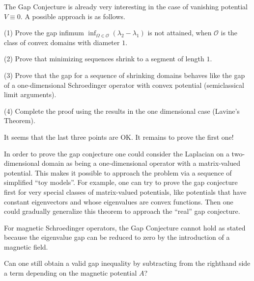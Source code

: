 \documentclass[12pt,letterpaper, reqno]{amsart}
\begin{document}
\begin{problemblock}
\begin{problem}[3.4]  
The Gap Conjecture is already
very interesting in the case of vanishing potential $V \equiv 0$. A
possible approach is as follows.

(1) Prove the gap infimum $\inf_{\Omega \in \mathcal{O}} (\lambda_2-\lambda_1)$
is not attained, when $\mathcal{O}$ is the class of convex domains
with diameter $1$.

(2) Prove that minimizing sequences shrink to a segment of
length $1$.

(3) Prove that the gap for a sequence of shrinking domains
behaves like the gap of a one-dimensional Schroedinger
operator with convex potential (semiclassical limit arguments).

(4) Complete the proof using the results in the one dimensional case (Lavine's Theorem).

\end{problem}
\begin{distinguishedremark}
It seems that the last three points are OK. It remains to prove the first one!
\end{distinguishedremark}
\end{problemblock}




\begin{problemblock} 
\begin{problem}[3.5]  
In order to prove the gap conjecture one could consider
the Laplacian on a two-dimensional domain as being a one-dimensional
operator with a matrix-valued potential. This makes it possible to
approach the problem via a sequence of simplified ``toy models''.
For example, one can try to prove the gap conjecture first for very
special classes of matrix-valued potentials, like potentials that
have constant eigenvectors and whose eigenvalues are convex
functions. Then one could gradually generalize this theorem to
approach the ``real'' gap conjecture.
\end{problem}

\end{problemblock}

\begin{problemblock}
For magnetic Schroedinger operators,
the Gap Conjecture cannot hold as stated because the eigenvalue gap
can be reduced to zero by the introduction of a magnetic field.


\begin{problem}[3.55] 
Can one still obtain a valid gap inequality by subtracting from the
righthand side a term depending on the magnetic potential $A$?
\end{problem}
\end{problemblock}
\end{document}
